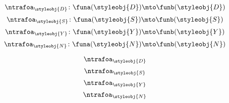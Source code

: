 {\begin{forslides}
    \begin{equation}
        \label{eq:eq_nt_3}
        \ntrafoa_{\styleobj{D}}\colon \funa(\styleobj{D}) \mto \funb(\styleobj{D})
    \end{equation}
    \begin{equation}
        \label{eq:eq_nt_4}
        \ntrafoa_{\styleobj{S}}\colon \funa(\styleobj{S}) \mto \funb(\styleobj{S})
    \end{equation}
    \begin{equation}
        \label{eq:eq_nt_5}
        \ntrafoa_{\styleobj{Y}}\colon \funa(\styleobj{Y}) \mto \funb(\styleobj{Y})
    \end{equation}
    \begin{equation}
        \label{eq:eq_nt_6}
        \ntrafoa_{\styleobj{N}}\colon \funa(\styleobj{N}) \mto \funb(\styleobj{N})
    \end{equation}

    \begin{equation}
        \label{eq:eq_nt_3a}
        \ntrafoa_{\styleobj{D}}
    \end{equation}
    \begin{equation}
        \label{eq:eq_nt_4a}
        \ntrafoa_{\styleobj{S}}
    \end{equation}
    \begin{equation}
        \label{eq:eq_nt_5a}
        \ntrafoa_{\styleobj{Y}}
    \end{equation}
    \begin{equation}
        \label{eq:eq_nt_6a}
        \ntrafoa_{\styleobj{N}}
    \end{equation}



\end{forslides}}
